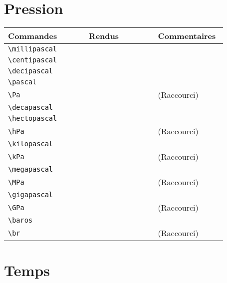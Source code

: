\documentclass[a4paper,12pt]{article}
\newcommand{\rac}{({\color{red}Raccourci})}
\begin{document}
	
	\section{Pression}
	
	\noindent
	\begin{tabular}{|p{0.35\linewidth}|p{0.3\linewidth}|p{0.3\linewidth}|}
		\hline
 			\textbf{Commandes}&\textbf{Rendus}&\textbf{Commentaires}
 		\\\hline\hline
			\verb!\millipascal!	& 	\millipascal	&	\\
		\hline
			\verb!\centipascal!	& 	\centipascal	&	\\
		\hline
			\verb!\decipascal!	& 	\decipascal	&	\\
		\hline
			\verb!\pascal!		& 	\pascal	&	\\
		\hline
			\verb!\Pa!		& 	\Pa	&	\rac\\
		\hline
			\verb!\decapascal!	& 	\decapascal	&	\\
		\hline
			\verb!\hectopascal!	& 	\hectopascal	&	\\
		\hline
			\verb!\hPa!		& 	\hPa		&	\rac\\
		\hline
			\verb!\kilopascal!	& 	\kilopascal	&	\\
		\hline
			\verb!\kPa!	& 	\kPa	&	\rac\\
		\hline
			\verb!\megapascal!	& 	\megapascal	&	\\
		\hline
			\verb!\MPa!		& 	\MPa		&	\rac\\
		\hline
			\verb!\gigapascal!	& 	\gigapascal	&	\\
		\hline
			\verb!\GPa!		& 	\GPa		&	\rac\\
		\hline
			\verb!\baros!		& 	\baros		&	\\
		\hline
			\verb!\br!		& 	\br		&	\rac\\
		\hline
	\end{tabular}
	
	
	
	
	\section{Temps}
	
\end{document}
